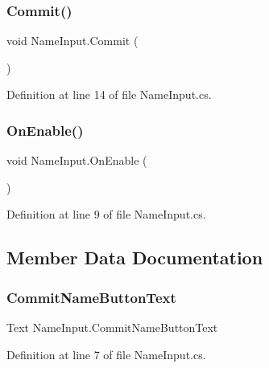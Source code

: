 \subsubsection{\texorpdfstring{Commit()}{Commit()}}
{\footnotesize\ttfamily void Name\+Input.\+Commit (\begin{DoxyParamCaption}{ }\end{DoxyParamCaption})}



Definition at line 14 of file Name\+Input.\+cs.

\mbox{\label{class_name_input_a1b37a22538af645721ca082b935901a3}} 
\subsubsection{\texorpdfstring{OnEnable()}{OnEnable()}}
{\footnotesize\ttfamily void Name\+Input.\+On\+Enable (\begin{DoxyParamCaption}{ }\end{DoxyParamCaption})}



Definition at line 9 of file Name\+Input.\+cs.



\subsection{Member Data Documentation}
\mbox{\label{class_name_input_a112c207988c098b75bc8893db91cb9ed}} 
\subsubsection{\texorpdfstring{CommitNameButtonText}{CommitNameButtonText}}
{\footnotesize\ttfamily Text Name\+Input.\+Commit\+Name\+Button\+Text}



Definition at line 7 of file Name\+Input.\+cs.

\mbox{\label{class_name_input_a94a65c0729c11264f430f84d38b4ece1}} 
